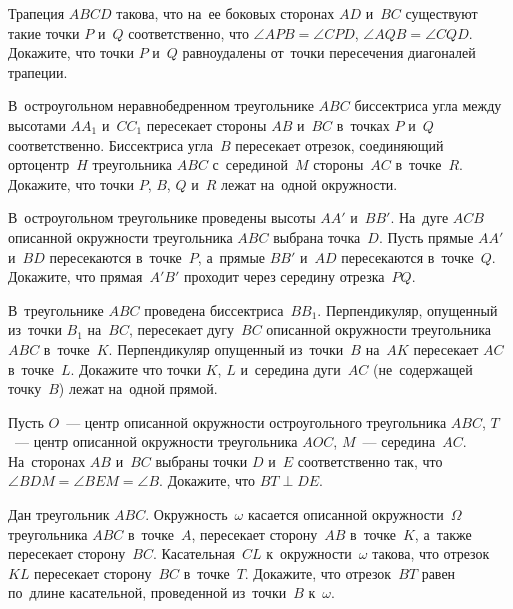 



\begin{problems}

\item
Трапеция $ABCD$ такова, что на~ее боковых сторонах $AD$ и~$BC$ существуют такие
точки $P$ и~$Q$ соответственно, что
$\angle APB = \angle CPD$, $\angle AQB = \angle CQD$.
Докажите, что точки $P$ и~$Q$ равноудалены от~точки пересечения диагоналей
трапеции.

\item
В~остроугольном неравнобедренном треугольнике $ABC$ биссектриса угла между
высотами $A A_1$ и~$C C_1$ пересекает стороны $AB$ и~$BC$ в~точках $P$ и~$Q$
соответственно.
Биссектриса угла~$B$ пересекает отрезок, соединяющий ортоцентр~$H$
треугольника $ABC$ с~серединой~$M$ стороны~$AC$ в~точке~$R$.
Докажите, что точки $P$, $B$, $Q$ и~$R$ лежат на~одной окружности.

\item
В~остроугольном треугольнике проведены высоты $AA'$ и~$BB'$.
На~дуге $ACB$ описанной окружности треугольника $ABC$ выбрана точка~$D$.
Пусть прямые $AA'$ и~$BD$ пересекаются в~точке~$P$, а~прямые $BB'$ и~$AD$
пересекаются в~точке~$Q$.
Докажите, что прямая~$A'B'$ проходит через середину отрезка~$PQ$.

\item
В~треугольнике $ABC$ проведена биссектриса~$B B_1$.
Перпендикуляр, опущенный из~точки $B_1$ на~$BC$, пересекает дугу~$BC$
описанной окружности треугольника $ABC$ в~точке~$K$.
Перпендикуляр опущенный из~точки~$B$ на~$AK$ пересекает $AC$ в~точке~$L$.
Докажите что точки $K$, $L$ и~середина дуги~$AC$ (не~содержащей точку~$B$)
лежат на~одной прямой.

\item
Пусть $O$~--- центр описанной окружности остроугольного треугольника $ABC$,
$T$~--- центр описанной окружности треугольника $AOC$, $M$~--- середина~$AC$.
На~сторонах $AB$ и~$BC$ выбраны точки $D$ и~$E$ соответственно так, что 
$\angle BDM = \angle BEM = \angle B$.
Докажите, что $BT \perp DE$.

\item
Дан треугольник $ABC$.
Окружность~$\omega$ касается описанной окружности~$\Omega$ треугольника $ABC$
в~точке~$A$, пересекает сторону~$AB$ в~точке~$K$, а~также пересекает
сторону~$BC$.
Касательная~$CL$ к~окружности~$\omega$ такова, что отрезок~$KL$ пересекает
сторону~$BC$ в~точке~$T$.
Докажите, что отрезок~$BT$ равен по~длине касательной, проведенной из~точки~$B$
к~$\omega$.

\end{problems}

